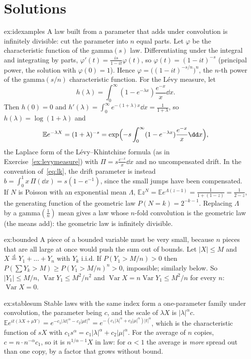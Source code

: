 \section{Solutions}

\begin{solution}{ex:idexamples}
\idea A law built from a parameter that adds under convolution is infinitely divisible: cut the parameter into $n$ equal parts.
\writeup Let $\varphi$ be the characteristic function of the gamma$(s)$ law. Differentiating under the integral and integrating by parts,
$\varphi'(t)=\frac{is}{1-it}\varphi(t)$, so $\varphi(t)=(1-it)^{-s}$ (principal power, the solution with $\varphi(0)=1$). Hence $\varphi=\bigl((1-it)^{-s/n}\bigr)^n$, the $n$-th power
of the gamma$(s/n)$ characteristic function. For the L\'evy measure, let
\[
h(\lambda)=\int_0^\infty(1-e^{-\lambda x})\frac{e^{-x}}x\dd x.
\]
Then $h(0)=0$ and $h'(\lambda)=\int_0^\infty e^{-(1+\lambda)x}\dd x=\frac1{1+\lambda}$, so $h(\lambda)=\log(1+\lambda)$ and
\[
\mathbb Ee^{-\lambda X}=(1+\lambda)^{-s}=\exp\Bigl(-s\int_0^\infty(1-e^{-\lambda x})\frac{e^{-x}}x\dd x\Bigr),
\]
the Laplace form of the L\'evy--Khintchine formula (as in Exercise~\ref{ex:levymeasure}) with $\Pi=s\frac{e^{-x}}x\dd x$ and no uncompensated drift. In the convention of~\eqref{eq:lk}, the drift parameter is instead $b=\int_0^1x\,\Pi(\dd x)=s(1-e^{-1})$, since the small jumps have been compensated. If $N$ is Poisson with an exponential mean $\Lambda$,
$\mathbb Ez^N=\mathbb Ee^{\Lambda(z-1)}=\frac1{1+(1-z)}=\frac1{2-z}$, the generating function of the geometric law $P(N=k)=2^{-k-1}$. Replacing $\Lambda$ by a gamma$(\frac1n)$
mean gives a law whose $n$-fold convolution is the geometric law (the means add): the geometric law is infinitely divisible.
\end{solution}

\begin{solution}{ex:bounded}
\idea A piece of a bounded variable must be very small, because $n$ pieces that are all large at once would push the sum out of bounds.
\writeup Let $|X|\le M$ and $X\overset{\mathrm d}=Y_1+\dots+Y_n$ with $Y_k$ i.i.d. If $P(Y_1>M/n)>0$ then $P(\sum Y_k>M)\ge P(Y_1>M/n)^n>0$, impossible; similarly below.
So $|Y_1|\le M/n$, $\operatorname{Var}Y_1\le M^2/n^2$ and $\operatorname{Var}X=n\operatorname{Var}Y_1\le M^2/n$ for every $n$: $\operatorname{Var}X=0$.
\end{solution}

\begin{solution}{ex:stablesum}
\idea Stable laws with the same index form a one-parameter family under convolution, the parameter being $c$, and the scale of $\lambda X$ is $|\lambda|^\alpha c$.
\writeup $\mathbb Ee^{it(\lambda X+\mu Y)}=e^{-c_1|\lambda t|^\alpha-c_2|\mu t|^\alpha}=e^{-(c_1|\lambda|^\alpha+c_2|\mu|^\alpha)|t|^\alpha}$, which is the characteristic function of $sX$ with
$c_1s^\alpha=c_1|\lambda|^\alpha+c_2|\mu|^\alpha$. For the average of $n$ copies, $c=n\cdot n^{-\alpha}c_1$, so it is $n^{1/\alpha-1}X$ in law: for $\alpha<1$ the average is
\emph{more} spread out than one copy, by a factor that grows without bound.
\end{solution}

